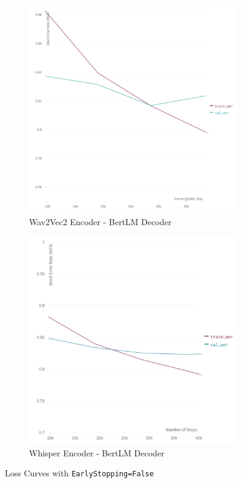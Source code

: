 \begin{figure} 
     \begin{subfigure}[b]{0.48\textwidth}
         \includegraphics[width=\textwidth]{05-research study/figures/wav2vec2-bert-wer-graph.pdf}
         \caption{Wav2Vec2 Encoder - BertLM Decoder}
         \label{fig:wav2vec2-bert}
     \end{subfigure}
     \hfill
     \begin{subfigure}[b]{0.48\textwidth}
         \includegraphics[width=\textwidth]{05-research study/figures/whisper-bert-wer-graph.pdf}
         \caption{Whisper Encoder - BertLM Decoder}
         \label{fig:whisper-bert}
     \end{subfigure}
     \hfill
        \caption{Loss Curves with \texttt{EarlyStopping=False}}
        \label{fig:encoder-decoder-loss-curves}
\end{figure}

